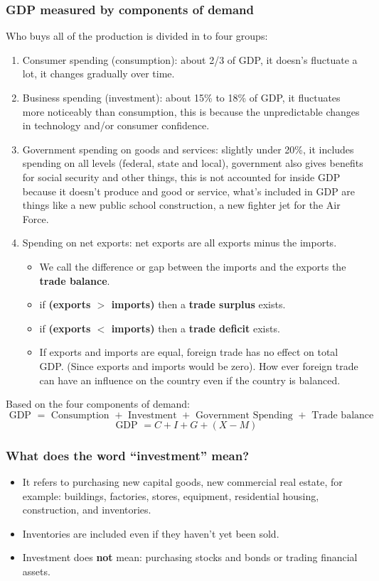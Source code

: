 \documentclass{article}
\begin{document}
\subsubsection{GDP measured by components of demand}
Who buys all of the production is divided in to four groups: 
\begin{enumerate}
    \item Consumer spending (consumption): about 2/3 of GDP, it doesn's fluctuate a lot, it changes gradually over time. 
    \item Business spending (investment): about 15\% to 18\% of GDP, it fluctuates more noticeably than consumption, this is because the unpredictable changes in technology and/or consumer confidence.
    \item Government spending on goods and services: slightly under 20\%, it includes spending on all levels (federal, state and local), government also gives benefits for social security and other things, this is not accounted for inside GDP because it doesn't produce and good or service, what's included in GDP are things like a new public school construction, a new fighter jet for the Air Force.
    \item Spending on net exports: net exports are all exports minus the imports.
        \begin{itemize}
            \item We call the difference or gap between the imports and the exports the \textbf{trade balance}.
            \item if \textbf{(exports $>$ imports)} then a \textbf{trade surplus} exists.
            \item  if \textbf{(exports $<$ imports)} then a \textbf{trade deficit} exists.
            \item If exports and imports are equal, foreign trade has no effect on total GDP. (Since exports and imports would be zero). How ever foreign trade can have an influence on the country even if the country is balanced. 
        \end{itemize}
\end{enumerate}
Based on the four components of demand: 
\[
  \text{ GDP } = \text{ Consumption } + \text{ Investment } + \text{ Government Spending } + \text{ Trade balance }
\]
\[
  \text{ GDP } = C + I + G + (X - M)
\]

\subsubsection{What does the word ``investment'' mean?}
\begin{itemize}
    \item It refers to purchasing new capital goods, new commercial real estate, for example: buildings, factories, stores, equipment, residential housing, construction, and inventories.
    \item Inventories are included even if they haven't yet been sold. 
    \item Investment does \textbf{not} mean: purchasing stocks and bonds or trading financial assets.  
\end{itemize}
\end{document}
